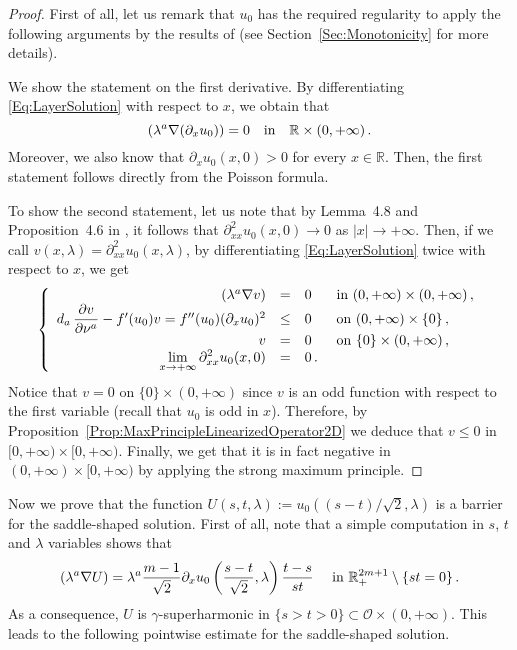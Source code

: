 \documentclass[12pt,reqno]{amsart}
\theoremstyle{definition}
\theoremstyle{remark}
\newcommand{\con}[1]{\mathbb{#1}}
\newcommand{\R}{\con{R}} %
\newcommand{\ocal}{\mathcal{O}}
\newcommand{\s}{\gamma}
\newcommand{\bpar}[1]{\left ( {#1}\right )}
\newcommand\beqc[1]{\left\{\begin{array}{#1}}
\newcommand\eeqc{\end{array} \right.}
\def\PDEsystem{rcll}
\let\div\relax
\DeclareMathOperator{\div}{div}
\def\ds{\displaystyle}
\numberwithin{equation}{section}
\begin{document}
\begin{proof}
First of all, let us remark that $u_0$ has the required regularity to apply the following arguments by the results of \cite{CabreSireI} (see Section~\ref{Sec:Monotonicity} for more details).


We show the statement on the first derivative. By differentiating \eqref{Eq:LayerSolution} with respect to $x$, we obtain that 
$$\div(\lambda^a \nabla (\partial_x u_0)) = 0\ \ \ \text{in} \ \ \ \R\times (0,+\infty)\,.$$ 
Moreover, we also know that $\partial_x u_0(x,0) > 0$ for every $x\in \R$. Then, the first statement follows directly from the Poisson formula.

To show the second statement, let us note that by Lemma~4.8 and Proposition~4.6 in \cite{CabreSireI}, it follows that $\partial^2_{xx} u_0(x,0) \to 0$ as $|x|\to +\infty$.
Then, if we call $v(x,\lambda) = \partial^2_{xx} u_0(x,\lambda)$, by differentiating \eqref{Eq:LayerSolution} twice with respect to $x$, we get
\begin{equation*}
\beqc{\PDEsystem}
\div(\lambda^a \nabla v) &=& 0 & \text{ in } (0,+\infty)\times (0,+\infty) \,, \\
d_a\,\dfrac{\partial v}{\partial \nu^a} - f'(u_0) v = f''(u_0) (\partial_x u_0) ^2 &\leq & 0 & \text{ on } (0,+\infty) \times \{0\} \,, \\
v & = & 0 & \text{ on } \{0\} \times (0,+\infty) \,, \\
\ds \lim_{x\to +\infty} \partial^2_{xx} u_0(x,0)  &= &0\,.
\eeqc
\end{equation*}
Notice that $v = 0$ on $\{0\} \times (0,+\infty)$ since $v$ is an odd function with respect to the first variable (recall that $u_0$ is odd in $x$). Therefore, by Proposition~\ref{Prop:MaxPrincipleLinearizedOperator2D} we deduce that $v\leq 0$ in $[0,+\infty)\times [0,+\infty)$. Finally, we get that it is in fact negative in $(0,+\infty)\times [0,+\infty)$ by applying the strong maximum principle.
\end{proof}

Now we prove that the function $U(s,t,\lambda) := u_0 ( (s-t)/\sqrt{2}, \lambda)$ is a barrier for the saddle-shaped solution. First of all, note that a simple computation in $s$, $t$ and $\lambda$ variables shows that
\begin{equation}
\label{Eq:EqForULayer}
\div (\lambda^a \nabla U) = \lambda^a \dfrac{m-1}{\sqrt{2}} \partial_x u_0 \bpar{\dfrac{s-t}{\sqrt{2}}, \lambda} \dfrac{t-s}{st} \quad \text{ in } \R^{2m + 1}_+ \setminus \{st=0\}\,.
\end{equation}
As a consequence, $U$ is $\s$-superharmonic in $\{s>t>0\} \subset \ocal \times (0, +\infty)$. This leads to the following pointwise estimate for the saddle-shaped solution.
\end{document}

